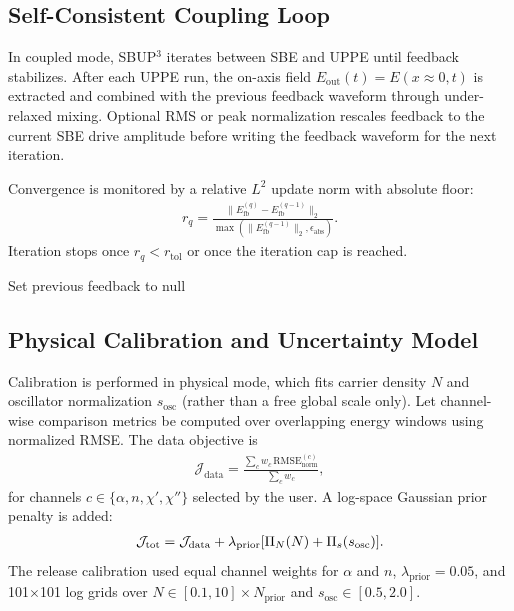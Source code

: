 \documentclass[aps,pra,twocolumn,reprint,superscriptaddress,nofootinbib]{revtex4-2}
\let\originalleft\left
\let\originalright\right
\renewcommand{\left}{\mathopen{}\mathclose\bgroup\originalleft}
\renewcommand{\right}{\aftergroup\egroup\originalright}
\begin{document}
\subsection{Self-Consistent Coupling Loop}
In coupled mode, SBUP$^3$ iterates between SBE and UPPE until feedback
stabilizes. After each UPPE run, the on-axis field
$E_{\mathrm{out}}(t)=E(x\approx0,t)$ is extracted and combined with the previous
feedback waveform through under-relaxed mixing. Optional RMS or peak
normalization rescales feedback to the current SBE drive amplitude before
writing the feedback waveform for the next iteration.

Convergence is monitored by a relative $L^2$ update norm with absolute floor:
\begin{align}
r_q=\frac{\|E_{\mathrm{fb}}^{(q)}-E_{\mathrm{fb}}^{(q-1)}\|_2}
{\max(\|E_{\mathrm{fb}}^{(q-1)}\|_2,\epsilon_{\mathrm{abs}})}.
\end{align}
Iteration stops once $r_q<r_{\mathrm{tol}}$ or once the iteration cap is
reached.

\begin{algorithm}[t]
\caption{Self-consistent SBE-UPPE coupling}
Set previous feedback to null\;
\end{algorithm}

\subsection{Physical Calibration and Uncertainty Model}
Calibration is performed in physical mode, which fits carrier density $N$ and oscillator normalization
$s_{\mathrm{osc}}$ (rather than a free global scale only). Let channel-wise
comparison metrics be computed over overlapping energy windows using normalized
RMSE. The data objective is
\begin{align}
\mathcal{J}_{\mathrm{data}}=
\frac{\sum_c w_c\,\mathrm{RMSE}^{(c)}_{\mathrm{norm}}}{\sum_c w_c},
\end{align}
for channels $c\in\{\alpha,n,\chi',\chi''\}$ selected by the user. A log-space
Gaussian prior penalty is added:
\begin{align}
\mathcal{J}_{\mathrm{tot}}=
\mathcal{J}_{\mathrm{data}}+\lambda_{\mathrm{prior}}
\left[\Pi_N(N)+\Pi_s(s_{\mathrm{osc}})\right].
\end{align}
The release calibration used equal channel weights for $\alpha$ and $n$,
$\lambda_{\mathrm{prior}}=0.05$, and 101$\times$101 log grids over
$N\in[0.1,10]\times N_{\mathrm{prior}}$ and
$s_{\mathrm{osc}}\in[0.5,2.0]$.
\end{document}
